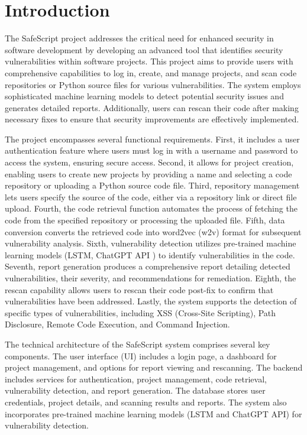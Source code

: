 \chapter{Introduction}\label{chap:introduction}

The SafeScript project addresses the critical need for enhanced security in software development by developing an advanced tool that identifies 
security vulnerabilities within software projects. This project aims to provide users with comprehensive capabilities to log in, create, and manage projects, 
and scan code repositories or Python source files for various vulnerabilities. The system employs sophisticated machine learning models to detect 
potential security issues and generates detailed reports. Additionally, users can rescan their code after making necessary fixes to ensure that security 
improvements are effectively implemented.

The project encompasses several functional requirements. 
First, it includes a user authentication feature where users must log in with a username and password to access the system, ensuring secure access. 
Second, it allows for project creation, enabling users to create new projects by providing a name and selecting a code repository or uploading a 
Python source code file. 
Third, repository management lets users specify the source of the code, either via a repository link or direct file upload. 
Fourth, the code retrieval function automates the process of fetching the code from the specified repository or processing the uploaded file. 
Fifth, data conversion converts the retrieved code into word2vec (w2v) format for subsequent vulnerability analysis. 
Sixth, vulnerability detection utilizes pre-trained machine learning models (LSTM, ChatGPT API \cite{chatgpt}) to identify vulnerabilities in the code. 
Seventh, report generation produces a comprehensive report detailing detected vulnerabilities, their severity, and recommendations for remediation. 
Eighth, the rescan capability allows users to rescan their code post-fix to confirm that vulnerabilities have been addressed. 
Lastly, the system supports the detection of specific types of vulnerabilities, including XSS (Cross-Site Scripting), Path Disclosure, Remote 
Code Execution, and Command Injection.

The technical architecture of the SafeScript system comprises several key components. 
The user interface (UI) includes a login page, a dashboard for project management, and options for report viewing and rescanning. 
The backend includes services for authentication, project management, code retrieval, vulnerability detection, and report generation. 
The database stores user credentials, project details, and scanning results and reports. 
The system also incorporates pre-trained machine learning models (LSTM and ChatGPT API) for vulnerability detection.

